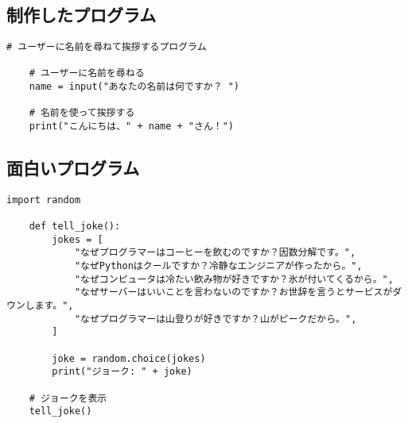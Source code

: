 \chapter{}\label{chap:appendixA}
\vspace{20mm}\hrulefill\\\vspace{20mm}

\section{制作したプログラム}

\begin{lstlisting}[caption=greeting.py,label=greeting.py]
    # ユーザーに名前を尋ねて挨拶するプログラム

    # ユーザーに名前を尋ねる
    name = input("あなたの名前は何ですか？ ")
    
    # 名前を使って挨拶する
    print("こんにちは、" + name + "さん！")
\end{lstlisting}

\section{面白いプログラム}

\begin{lstlisting}[caption=tell\_joke.py,label=joke.py]
    import random

    def tell_joke():
        jokes = [
            "なぜプログラマーはコーヒーを飲むのですか？因数分解です。",
            "なぜPythonはクールですか？冷静なエンジニアが作ったから。",
            "なぜコンピュータは冷たい飲み物が好きですか？氷が付いてくるから。",
            "なぜサーバーはいいことを言わないのですか？お世辞を言うとサービスがダウンします。",
            "なぜプログラマーは山登りが好きですか？山がピークだから。",
        ]
    
        joke = random.choice(jokes)
        print("ジョーク: " + joke)
    
    # ジョークを表示
    tell_joke()
    

\end{lstlisting}

